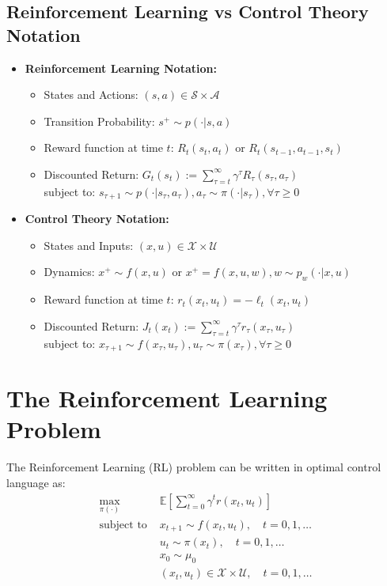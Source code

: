 \documentclass[openany]{book}
\theoremstyle{definition}
\theoremstyle{remark}
\begin{document}
\subsection{Reinforcement Learning vs Control Theory Notation}
\begin{itemize}
    \item \textbf{Reinforcement Learning Notation:}
    \begin{itemize}
        \item States and Actions: $(s,a) \in \mathcal{S} \times \mathcal{A}$
        \item Transition Probability: $s^+ \sim p(\cdot|s,a)$
        \item Reward function at time $t$: $R_t(s_t,a_t)$ or $R_t(s_{t-1},a_{t-1},s_t)$
        \item Discounted Return: $G_t(s_t) := \sum_{\tau=t}^{\infty} \gamma^\tau R_\tau(s_\tau,a_\tau)$\\
        subject to: $s_{\tau+1} \sim p(\cdot|s_\tau,a_\tau), a_\tau \sim \pi(\cdot|s_\tau), \forall \tau \geq 0$
    \end{itemize}

    \item \textbf{Control Theory Notation:}
    \begin{itemize}
        \item States and Inputs: $(x,u) \in \mathcal{X} \times \mathcal{U}$
        \item Dynamics: $x^+ \sim f(x,u)$ or $x^+ = f(x,u,w), w \sim p_w(\cdot|x,u)$
        \item Reward function at time $t$: $r_t(x_t,u_t) = -\ell_t(x_t,u_t)$
        \item Discounted Return: $J_t(x_t) := \sum_{\tau=t}^{\infty} \gamma^\tau r_\tau(x_\tau,u_\tau)$\\
        subject to: $x_{\tau+1} \sim f(x_\tau,u_\tau), u_\tau \sim \pi(x_\tau), \forall \tau \geq 0$
    \end{itemize}
\end{itemize}

\section{The Reinforcement Learning Problem}
The Reinforcement Learning (RL) problem can be written in optimal control language as:
\begin{align*}
    \max_{\pi(\cdot)} & \mathbb{E}\left[\sum_{t=0}^{\infty} \gamma^t r(x_t,u_t)\right] \\
    \text{subject to } & x_{t+1} \sim f(x_t,u_t), \quad t=0,1,\ldots \\
    & u_t \sim \pi(x_t), \quad t=0,1,\ldots \\
    & x_0 \sim \mu_0 \\
    & (x_t,u_t) \in \mathcal{X} \times \mathcal{U}, \quad t=0,1,\ldots
\end{align*}
\end{document}
